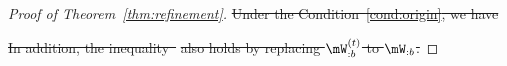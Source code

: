 \documentclass[lettersize,onecolumn,journal]{IEEEtran}
\theoremstyle{definition}
\newtheorem{lem}{Lemma}
\theoremstyle{definition}
\providecommand{\DIFdeltex}[1]{{\protect\color{red}\sout{#1}}}                      %
\providecommand{\DIFdel}[1]{\texorpdfstring{\DIFdeltex{#1}}{}} %
\begin{document}
\begin{proof}[Proof of Theorem~\ref{thm:refinement}]
\DIFdel{Under the Condition~\ref{cond:origin}, we have
    }%

\DIFdel{In addition, the inequality~}%
\DIFdel{also holds by replacing $\mW_{:b}^{(t)}$ to $\mW_{:b}$.
    }%


\end{proof}
\end{document}
